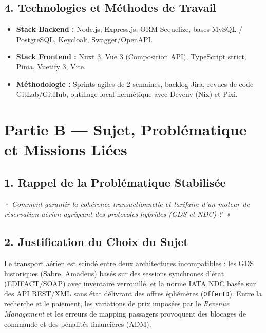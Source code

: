 \documentclass[11pt,a4paper]{article}
\begin{document}
\subsection*{4. Technologies et Méthodes de Travail}
\begin{itemize}[itemsep=2pt]
    \item \textbf{Stack Backend :} Node.js, Express.js, ORM Sequelize, bases MySQL / PostgreSQL, Keycloak, Swagger/OpenAPI.
    \item \textbf{Stack Frontend :} Nuxt 3, Vue 3 (Composition API), TypeScript strict, Pinia, Vuetify 3, Vite.
    \item \textbf{Méthodologie :} Sprints agiles de 2 semaines, backlog Jira, revues de code GitLab/GitHub, outillage local hermétique avec Devenv (Nix) et Pixi.
\end{itemize}

\vspace{0.4cm}
\section*{Partie B — Sujet, Problématique et Missions Liées}

\subsection*{1. Rappel de la Problématique Stabilisée}
\begin{tcolorbox}[colback=LightGray, colframe=NavyBlue, arc=4pt, boxrule=1.2pt]
\centering\large\itshape\color{NavyBlue}
«~Comment garantir la cohérence transactionnelle et tarifaire d'un moteur de réservation aérien agrégeant des protocoles hybrides (GDS et NDC) ?~»
\end{tcolorbox}

\subsection*{2. Justification du Choix du Sujet}
Le transport aérien est scindé entre deux architectures incompatibles : les GDS historiques (Sabre, Amadeus) basés sur des sessions synchrones d'état (EDIFACT/SOAP) avec inventaire verrouillé, et la norme IATA NDC basée sur des API REST/XML sans état délivrant des offres éphémères (\texttt{OfferID}). Entre la recherche et le paiement, les variations de prix imposées par le \textit{Revenue Management} et les erreurs de mapping passagers provoquent des blocages de commande et des pénalités financières (ADM).
\end{document}

